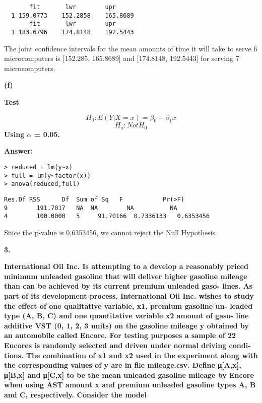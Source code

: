 \documentclass[letterpaper,11pt]{article}
\begin{document}
\begin{lstlisting}
       fit	     lwr	    upr
  1	159.0773	152.2858	165.8689
       fit	     lwr	    upr
  1	183.6796	174.8148	192.5443
\end{lstlisting}

 The joint confidence intervals for the mean amounts of time it will take to serve 6 microcomputers is [152.285, 165.8689] and [174.8148, 192.5443] for serving 7 microcomputers.

\bigbreak
\begin{addmargin}[-1.1em]{0em}
\textbf{(f)}\par\end{addmargin}
\textbf{Test}\par
$$H_0 : E(Y|X=x)=\beta_0+\beta_1x $$
$$H_a : Not H_0$$
\textbf{Using $\alpha$ = 0.05.}\par

\bigbreak
\begin{addmargin}[-0.5em]{0em}
\textbf{Answer: }\end{addmargin}

\begin{lstlisting}
> reduced = lm(y~x)
> full = lm(y~factor(x))
> anova(reduced,full)
\end{lstlisting}

\begin{lstlisting}
Res.Df RSS	    Df	Sum of Sq	F	        Pr(>F)
9	     191.7017	NA	NA	      NA	      NA
4	     100.0000	5	  91.70166	0.7336133	0.6353456
\end{lstlisting}
Since the p-value is 0.6353456, we cannot reject the Null Hypothesis.


  \bigbreak
  \begin{addmargin}[-2em]{0em} \large{\textbf{3. }}\end{addmargin}

  \begin{addmargin}[-1.1em]{0em} \textbf{International Oil Inc. Is attempting to a develop a reasonably priced minimum unleaded gasoline that will deliver higher gasoline mileage than can be achieved by its current premium unleaded gaso- lines. As part of its development process, International Oil Inc. wishes to study the effect of one qualitative variable, x1, premium gasoline un- leaded type (A, B, C) and one quantitative variable x2 amount of gaso- line additive VST (0, 1, 2, 3 units) on the gasoline mileage y obtained by an automobile called Encore. For testing purposes a sample of 22 Encores is randomly selected and driven under normal driving condi- tions. The combination of x1 and x2 used in the experiment along with the corresponding values of y are in file mileage.csv. Define μ[A,x], μ[B,x] and μ[C,x] to be the mean unleaded gasoline mileage by Encore when using AST amount x and premium unleaded gasoline types A, B and C, respectively. Consider the model
}\par\end{addmargin}
\end{document}

